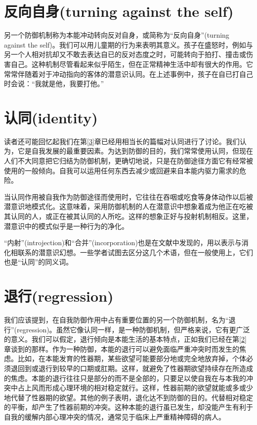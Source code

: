 \documentclass[UTF8,10pt,a4paper,openany]{book}
\begin{document}
\section*{反向自身(turning against the self)}
另一个防御机制称为本能冲动转向反对自身，或简称为“反向自身”(turning against the self)。我们可以用儿童期的行为来表明其意义。孩子在盛怒时，例如与另一个人相对抗却又不敢去表达自已的反对态度之时，可能转向于拍打、撞击或伤害自己。这种机制尽管看起来似乎陌生，但在正常精神生活中却有很大的作用。它常常伴随着对于冲动指向的客体的潜意识认同。在上述事例中，孩子在自已打自己时会说：“我就是他，我要打他。”

\section*{认同(identity)}
读者还可能回忆起我们在第\ref{3}章已经用相当长的篇幅对认同进行了讨论。我们认为，它是自我发展的最重要因素。为达到防御的目的，我们常常使用认同，但现在人们不大同意把它归结为防御机制，更确切地说，只是在防御途径方面它有经常被使用的一般倾向。自我可以运用任何东西去减少或回避来自本能内驱力需求的危险。

当认同作用被自我作为防御途径而使用时，它往往在吞咽或吃食等身体动作以后被潜意识地模式化。这意味着，采用防御机制的人在潜意识中想象着成为他正在吃被其认同的人，或正在被其认同的人所吃。这样的想象正好与投射机制相反。这里，潜意识中的模式似乎是一种行为的净化。

“内射”(introjection)和“合并”(incorporation)也是在文献中发现的，用以表示与消化相联系的潜意识幻想。一些学者试图去区分这几个术语，但在一般使用上，它们也是“认同”的同义词。

\section*{退行(regression)}
我们应该提到，在自我防御作用中占有重要位置的另一个防御机制，名为“退行”(regression)。虽然它像认同一样，是一种防御机制，但严格来说，它有更广泛的意义。我们可以假定，退行倾向是本能生活的基本特点，正如我们已经在第\ref{2}章谈到的那样。作为一种防御，本能的退行可以避免面临严重冲突时而发生的焦虑。比如，在本能发育的性器期，某些欲望可能要部分地或完全地放弃掉，个体必须退回到或退行到较早的口期或肛期。这样，就避免了性器期欲望持续存在所造成的焦虑。本能的退行往往只是部分的而不是全部的，只要足以使自我在与本我的冲突中占上风而形成心理环境的相对稳定就行。这样，性器前期的欲望就能或多或少地代替了性器期的欲望。其他的例子表明，退化达不到防御的目的。代替相对稳定的平衡，却产生了性器前期的冲突。这种本能的退行虽已发生，却没能产生有利于自我的缓解内部心理冲突的情况，通常见于临床上严重精神障碍的病人。
\end{document}
